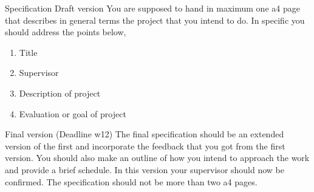 \documentclass[presentation]{beamer}
\begin{document}
\begin{frame}[label={sec:org8fff392}]{Specification}
\alert{Draft version} You are supposed to hand in maximum one a4 page that describes in general terms the project that you intend to do. In specific you should address the points below, 

\begin{enumerate}
\item Title
\item Supervisor
\item Description of project
\item Evaluation or goal of project
\end{enumerate}

\alert{Final version (Deadline w12)} The final specification should be an extended version of the first and incorporate the feedback that you got from the first version. You should also make an outline of how you intend to approach the work and provide a brief schedule. In this version your supervisor should now be confirmed. The specification should not be more than two a4 pages.
\end{frame}
\end{document}

